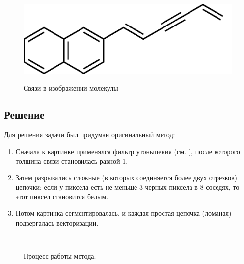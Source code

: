 \begin{figure}[H]
\centering
{\includegraphics[scale=0.3, trim = 0mm 0mm 0mm 0mm, clip]{imgs/graphics}}
\caption{Связи в изображении молекулы}
\end{figure}


\subsection{Решение}
Для решения задачи был придуман оригинальный метод:

\begin{enumerate}
 \item Сначала к картинке применялся фильтр утоньшения (см. \cite{cychosz}), после которого 
       толщина связи становилась равной 1. 
 \item Затем разрывались сложные (в которых соединяется более двух отрезков) цепочки: если у 
       пиксела есть не меньше 3 черных пиксела 
       в 8-соседях, то этот пиксел становится белым.
 \item Потом картинка сегментировалась, и каждая простая цепочка (ломаная) подвергалась векторизации.
\end{enumerate}

\begin{figure}[H]
\centering
{} \\
\caption{Процесс работы метода.}
\end{figure}


